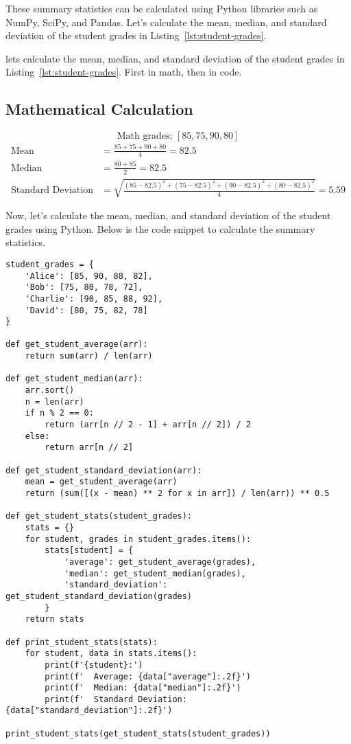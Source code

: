 These summary statistics can be calculated using Python libraries such as NumPy, SciPy, and Pandas. Let's calculate the mean, median, and standard deviation of the student grades in Listing~\ref{lst:student-grades}.

lets calculate the mean, median, and standard deviation of the student grades in Listing~\ref{lst:student-grades}. First in math, then in code.

\subsection{Mathematical Calculation}
\[
\text{Math grades: } [85, 75, 90, 80]
\]
\begin{align*}
\text{Mean} &= \frac{85 + 75 + 90 + 80}{4} = 82.5 \\
\text{Median} &= \frac{80 + 85}{2} = 82.5 \\
\text{Standard Deviation} &= \sqrt{\frac{(85 - 82.5)^2 + (75 - 82.5)^2 + (90 - 82.5)^2 + (80 - 82.5)^2}{4}} = 5.59
\end{align*}

Now, let's calculate the mean, median, and standard deviation of the student grades using Python. Below is the code snippet to calculate the summary statistics.
\newpage

\begin{lstlisting}[caption={Calculating Summary Statistics in Python}, label={lst:summary-statistics}]
student_grades = {
    'Alice': [85, 90, 88, 82],
    'Bob': [75, 80, 78, 72],
    'Charlie': [90, 85, 88, 92],
    'David': [80, 75, 82, 78]
}

def get_student_average(arr):
    return sum(arr) / len(arr)

def get_student_median(arr):
    arr.sort()
    n = len(arr)
    if n % 2 == 0:
        return (arr[n // 2 - 1] + arr[n // 2]) / 2
    else:
        return arr[n // 2]
    
def get_student_standard_deviation(arr):
    mean = get_student_average(arr)
    return (sum([(x - mean) ** 2 for x in arr]) / len(arr)) ** 0.5

def get_student_stats(student_grades):
    stats = {}
    for student, grades in student_grades.items():
        stats[student] = {
            'average': get_student_average(grades),
            'median': get_student_median(grades),
            'standard_deviation': get_student_standard_deviation(grades)
        }
    return stats

def print_student_stats(stats):
    for student, data in stats.items():
        print(f'{student}:')
        print(f'  Average: {data["average"]:.2f}')
        print(f'  Median: {data["median"]:.2f}')
        print(f'  Standard Deviation: {data["standard_deviation"]:.2f}')

print_student_stats(get_student_stats(student_grades))
\end{lstlisting}
